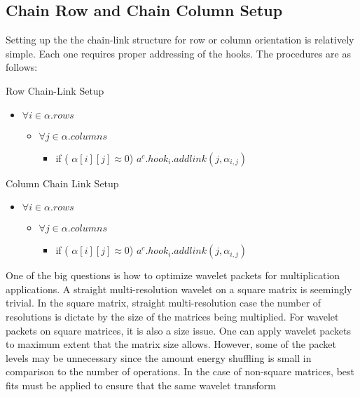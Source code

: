 \documentclass[11pt]{article}
\begin{document}
\subsection{Chain Row and Chain Column Setup}
Setting up the the chain-link structure for row or column orientation is relatively simple.  Each one requires proper addressing of the hooks.  The procedures are as follows:

Row Chain-Link Setup
\begin{itemize}
\item $\forall i  \in \alpha .rows$
\begin{itemize}
\item $\forall j \in \alpha . columns$
\begin{itemize}
\item if ( $\alpha [i][j] \approx 0 $)
$a^c.hook_i . addlink(j,\alpha_{i,j} ) $
\end{itemize}

\end{itemize}

\end{itemize}

Column Chain Link Setup
\begin{itemize}
\item $\forall i  \in \alpha .rows$
\begin{itemize}
\item $\forall j \in \alpha . columns$
\begin{itemize}
\item if ( $\alpha [i][j] \approx 0 $)
$a^c.hook_i . addlink(j,\alpha_{i,j} ) $
\end{itemize}

\end{itemize}

\end{itemize}

One of the big questions is how to optimize wavelet packets for multiplication applications.  A straight multi-resolution wavelet on a square matrix is seemingly trivial.  In the square matrix, straight multi-resolution case the number of resolutions is dictate by the size of the matrices being multiplied.  For wavelet packets on square matrices, it is also a size issue.  One can apply wavelet packets to maximum extent that the matrix size allows.  However, some of the packet levels may be unnecessary since the amount energy shuffling is small in comparison to the number of operations.  In the case of non-square matrices, best fits must be applied to ensure that the same wavelet transform 
\end{document}
